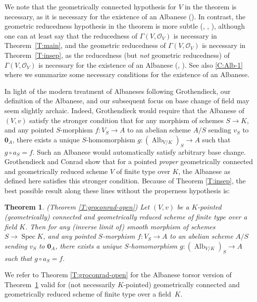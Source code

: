 \documentclass[11pt, reqno]{amsart}
\numberwithin{equation}{section}
\newtheorem{teoalpha}{Theorem}
\theoremstyle{definition}
\theoremstyle{remark}
\DeclareMathOperator{\alb}{Alb}
\DeclareMathOperator{\spec}{Spec}
\begin{document}
 
 
      
     
 We note that the geometrically connected hypothesis for $V$ in the
 theorem is necessary, as it is necessary for the existence of an
 Albanese ().  In contrast, the geometric reducedness hypothesis in the theorem is more subtle (, , ), although one can at least say that the reducedness of $\Gamma(V,\mathcal O_V)$ is necessary in Theorem~\ref{T:main}, and the geometric reducedness of $\Gamma(V,\mathcal O_V)$ is necessary in Theorem~\ref{T:insep}, as the reducedness (but \emph{not} geometric reducedness) of $\Gamma(V,\mathcal O_V)$ is necessary for the existence of an Albanese (, ). 
    See also  \ref{C:Alb-1} where we summarize some necessary  conditions for the existence of an Albanese. 
 


\medskip 
 In light of the modern treatment of Albaneses following Grothendieck, our definition of the Albanese, and our subsequent focus on  base change of field may seem slightly archaic.  Indeed,
 Grothendieck would require that the Albanese of $(V,v)$ satisfy the stronger condition that for any morphism of schemes $S\to K$,   and  any pointed $S$-morphism  $f: V_S \to A$ to an abelian
  scheme $A/S$ sending $v_S$ to $\mathbf 0_{A}$, there exists a unique  $S$-homomorphism $g: (\alb_{V/K})_S \to
  A$ such that $g\circ a_S = f$.  Such an Albanese would automatically satisfy arbitrary base change.   
 Grothendieck and Conrad show that for a  pointed \emph{proper}  geometrically connected and geometrically reduced scheme  $V$ of finite type over $K$, the Albanese as defined here satisfies this stronger condition.  Because of Theorem \ref{T:insep}, the
 best possible result
  along these lines 
  without the properness hypothesis 
 is:
 

             
  \setcounter{teoalpha}{2}
  \begin{teoalpha}(Theorem \ref{T:groconrad-open}) \label{T:C}
    Let $(V,v)$ be a $K$-pointed  (geometrically) connected and geometrically reduced 
   scheme of finite type over a field $K$.  
   Then for any (inverse limit of) smooth
   morphism of schemes $S  \to \spec K$, and any pointed $S$-morphism  $f: V_S \to A$ to an abelian
   scheme $A/S$ sending $v_S$ to $\mathbf 0_A$, there exists a unique  $S$-homomorphism $g: (\alb_{V/K})_S \to A$ such that $g\circ a_S = f$.
  \end{teoalpha}
We refer to Theorem \ref{T:groconrad-open} for the Albanese torsor version of Theorem~\ref{T:C} valid for (not necessarily $K$-pointed) geometrically connected and geometrically reduced 
scheme of finite type over a field~$K$.  
\end{document}
